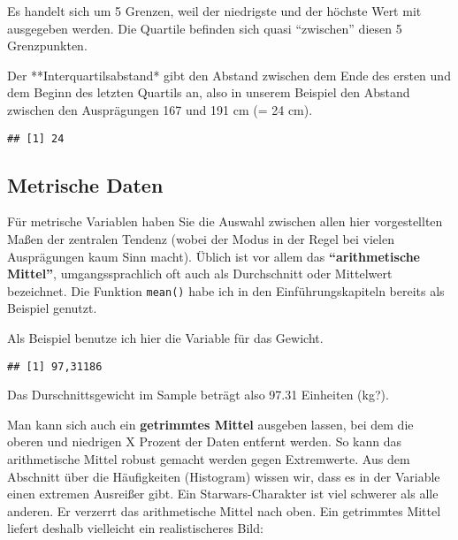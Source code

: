 \documentclass[
]{book}
\newenvironment{Shaded}{\begin{snugshade}}{\end{snugshade}}
\newcommand{\AttributeTok}[1]{\textcolor[rgb]{0.77,0.63,0.00}{#1}}
\newcommand{\ConstantTok}[1]{\textcolor[rgb]{0.00,0.00,0.00}{#1}}
\newcommand{\FunctionTok}[1]{\textcolor[rgb]{0.00,0.00,0.00}{#1}}
\newcommand{\NormalTok}[1]{#1}
\newcommand{\SpecialCharTok}[1]{\textcolor[rgb]{0.00,0.00,0.00}{#1}}
\begin{document}
Es handelt sich um 5 Grenzen, weil der niedrigste und der höchste Wert mit ausgegeben werden. Die Quartile befinden sich quasi ``zwischen'' diesen 5 Grenzpunkten.

Der **Interquartilsabstand* gibt den Abstand zwischen dem Ende des ersten und dem Beginn des letzten Quartils an, also in unserem Beispiel den Abstand zwischen den Ausprägungen 167 und 191 cm (= 24 cm).

\begin{Shaded}
\end{Shaded}

\begin{verbatim}
## [1] 24
\end{verbatim}

\hypertarget{metrische-daten}{%
\subsection{Metrische Daten}\label{metrische-daten}}

Für metrische Variablen haben Sie die Auswahl zwischen allen hier vorgestellten Maßen der zentralen Tendenz (wobei der Modus in der Regel bei vielen Ausprägungen kaum Sinn macht). Üblich ist vor allem das \textbf{``arithmetische Mittel''}, umgangssprachlich oft auch als Durchschnitt oder Mittelwert bezeichnet. Die Funktion \texttt{mean()} habe ich in den Einführungskapiteln bereits als Beispiel genutzt.

Als Beispiel benutze ich hier die Variable für das Gewicht.

\begin{Shaded}
\end{Shaded}

\begin{verbatim}
## [1] 97,31186
\end{verbatim}

Das Durschnittsgewicht im Sample beträgt also 97.31 Einheiten (kg?).

Man kann sich auch ein \textbf{getrimmtes Mittel} ausgeben lassen, bei dem die oberen und niedrigen X Prozent der Daten entfernt werden. So kann das arithmetische Mittel robust gemacht werden gegen Extremwerte. Aus dem Abschnitt über die Häufigkeiten (Histogram) wissen wir, dass es in der Variable einen extremen Ausreißer gibt. Ein Starwars-Charakter ist viel schwerer als alle anderen. Er verzerrt das arithmetische Mittel nach oben. Ein getrimmtes Mittel liefert deshalb vielleicht ein realistischeres Bild:
\end{document}
